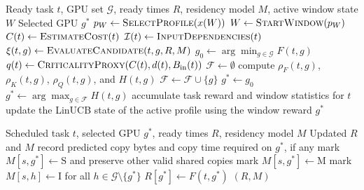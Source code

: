 \begin{algorithm}[!htbp]
\caption{HEFT-relative placement decision}
\label{alg:placement-decision}
\footnotesize
\begin{algorithmic}[1]
\Require Ready task $t$, GPU set $\mathcal{G}$, ready times $R$, residency model $M$, active window state $W$
\Ensure Selected GPU $g^{*}$
    \State $p_W \gets \Call{SelectProfile}{x(W)}$
    \State $W \gets \Call{StartWindow}{p_W}$
\EndIf
\State $C(t) \gets \Call{EstimateCost}{t}$
\State $\mathcal{I}(t) \gets \Call{InputDependencies}{t}$
    \State $\xi(t,g)\gets\Call{EvaluateCandidate}{t,g,R,M}$ 
\EndFor
\State $g_0\gets\arg\min_{g\in\mathcal{G}}F(t,g)$ 
\State $q(t)\gets\Call{CriticalityProxy}{C(t),d(t),B_{\mathrm{in}}(t)}$
\State $\mathcal{F}\gets\emptyset$
    \State compute $\rho_F(t,g)$, $\rho_K(t,g)$, $\rho_Q(t,g)$, and $H(t,g)$
        \State $\mathcal{F}\gets\mathcal{F}\cup\{g\}$
    \EndIf
\EndFor
{}
    \State $g^{*}\gets g_0$
\Else
    \State $g^{*}\gets\arg\max_{g\in\mathcal{F}}H(t,g)$ 
\EndIf
\State accumulate task reward and window statistics for $t$
    \State update the LinUCB state of the active profile using the window reward
\EndIf
\State \Return $g^{*}$
\end{algorithmic}
\end{algorithm}

\begin{algorithm}[!htbp]
\caption{Scheduler-state update after placement}
\label{alg:state-update}
\footnotesize
\begin{algorithmic}[1]
\Require Scheduled task $t$, selected GPU $g^{*}$, ready times $R$, residency model $M$
\Ensure Updated $R$ and $M$
        \State record predicted copy bytes and copy time required on $g^{*}$, if any
    \EndIf
        \State mark $M[s,g^{*}]\gets\mathrm{S}$ and preserve other valid shared copies
        \State mark $M[s,g^{*}]\gets\mathrm{M}$
        \State mark $M[s,h]\gets\mathrm{I}$ for all $h\in\mathcal{G}\setminus\{g^{*}\}$
    \EndIf
\EndFor
\State $R[g^{*}]\gets F(t,g^{*})$
\State \Return $(R,M)$
\end{algorithmic}
\end{algorithm}

